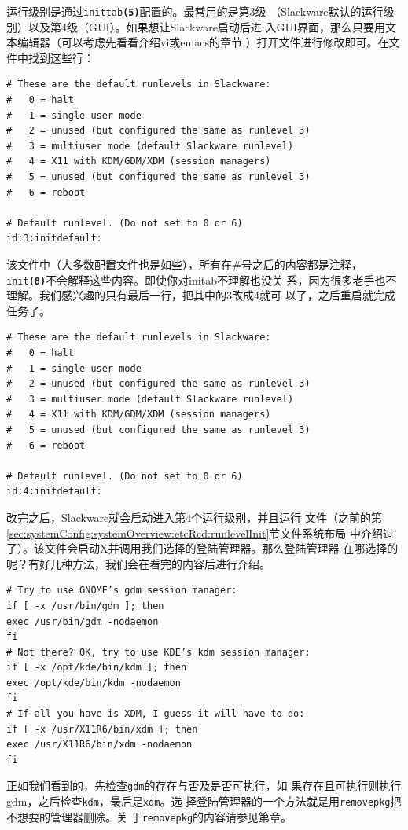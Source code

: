 运行级别是通过\texttt{inittab\textbf{(5)}}配置的。最常用的是第3级
（Slackware默认的运行级别）以及第4级（GUI）。如果想让Slackware启动后进
入GUI界面，那么只要用文本编辑器（可以考虑先看看介绍vi或emacs的章节
）打开文件进行修改即可。在文件中找到这些行：
\begin{Verbatim}[frame=single, commandchars=\\\{\}]
# These are the default runlevels in Slackware:
#   0 = halt
#   1 = single user mode
#   2 = unused (but configured the same as runlevel 3)
#   3 = multiuser mode (default Slackware runlevel)
#   4 = X11 with KDM/GDM/XDM (session managers)
#   5 = unused (but configured the same as runlevel 3)
#   6 = reboot

# Default runlevel. (Do not set to 0 or 6)
id:3:initdefault:
\end{Verbatim}
该文件中（大多数配置文件也是如些），所有在\#号之后的内容都是注释，
\texttt{init\textbf{(8)}}不会解释这些内容。即使你对initab不理解也没关
系，因为很多老手也不理解。我们感兴趣的只有最后一行，把其中的3改成4就可
以了，之后重启就完成任务了。
\begin{Verbatim}[frame=single, commandchars=\\\{\}]
# These are the default runlevels in Slackware:
#   0 = halt
#   1 = single user mode
#   2 = unused (but configured the same as runlevel 3)
#   3 = multiuser mode (default Slackware runlevel)
#   4 = X11 with KDM/GDM/XDM (session managers)
#   5 = unused (but configured the same as runlevel 3)
#   6 = reboot

# Default runlevel. (Do not set to 0 or 6)
id:4:initdefault:
\end{Verbatim}

改完之后，Slackware就会启动进入第4个运行级别，并且运行
文件（之前的第
\ref{sec:systemConfig:systemOverview:etcRcd:runlevelInit}节文件系统布局
中介绍过了）。该文件会启动X并调用我们选择的登陆管理器。那么登陆管理器
在哪选择的呢？有好几种方法，我们会在看完的内容后进行介绍。
\begin{Verbatim}[frame=single, commandchars=\\\{\}]
# Try to use GNOME’s gdm session manager:
if [ -x /usr/bin/gdm ]; then
exec /usr/bin/gdm -nodaemon
fi
# Not there? OK, try to use KDE’s kdm session manager:
if [ -x /opt/kde/bin/kdm ]; then
exec /opt/kde/bin/kdm -nodaemon
fi
# If all you have is XDM, I guess it will have to do:
if [ -x /usr/X11R6/bin/xdm ]; then
exec /usr/X11R6/bin/xdm -nodaemon
fi
\end{Verbatim}
正如我们看到的，先检查\texttt{gdm}的存在与否及是否可执行，如
果存在且可执行则执行gdm，之后检查\texttt{kdm}，最后是\texttt{xdm}。选
择登陆管理器的一个方法就是用\texttt{removepkg}把不想要的管理器删除。关
于\texttt{removepkg}的内容请参见第章。%

